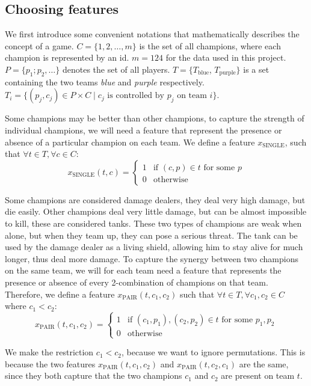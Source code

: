 \subsection{Choosing features}\label{sec:choosingfeatures}
We first introduce some convenient notations that mathematically describes the concept of a game.
$C = \{1, 2, \dots, m\}$ is the set of all champions, where each champion is represented by an id. $m = 124$ for the data used in this project.
$P = \{p_1; p_2, \dots\}$ denotes the set of all players.
$T = \{T_\text{blue}$, $T_\text{purple}\}$ is a set containing the two teams \emph{blue} and \emph{purple} respectively.
$T_i = \{ (p_j, c_j) \in P \times C \mid c_j \text{ is controlled by } p_j \text{ on team } i \}$.

Some champions may be better than other champions, to capture the strength of individual champions, we will need a feature that represent the presence or absence of a particular champion on each team.
We define a feature $x_{\text{SINGLE}}$, such that $\forall t \in T, \forall c \in C:$
\[
x_{\text{SINGLE}}(t, c) = 
\begin{cases} 
  1 & \text{if } (c, p) \in t \text{ for some } p \\
  0 & \text{otherwise} 
\end{cases}
\]

Some champions are considered damage dealers, they deal very high damage, but die easily. Other champions deal very little damage, but can be almost impossible to kill, these are considered tanks. These two types of champions are weak when alone, but when they team up, they can pose a serious threat. The tank can be used by the damage dealer as a living shield, allowing him to stay alive for much longer, thus deal more damage.
To capture the synergy between two champions on the same team, we will for each team need a feature that represents the presence or absence of every 2-combination of champions on that team. Therefore, we define a feature $x_\text{PAIR}(t, c_1, c_2)$ such that $\forall t \in T, \forall c_1, c_2 \in C$ where $c_1 < c_2$:
\[
x_\text{PAIR}(t, c_1, c_2) =
\begin{cases}
  1 & \text{if } (c_1, p_1), (c_2, p_2) \in t \text{ for some }p_1, p_2\\
  0 & \text{otherwise}
\end{cases}
\]

We make the restriction $c_1 < c_2$, because we want to ignore permutations. This is because the two features $x_\text{PAIR}(t, c_1, c_2)$ and $x_\text{PAIR}(t, c_2, c_1)$ are the same, since they both capture that the two champions $c_1$ and $c_2$ are present on team $t$.

